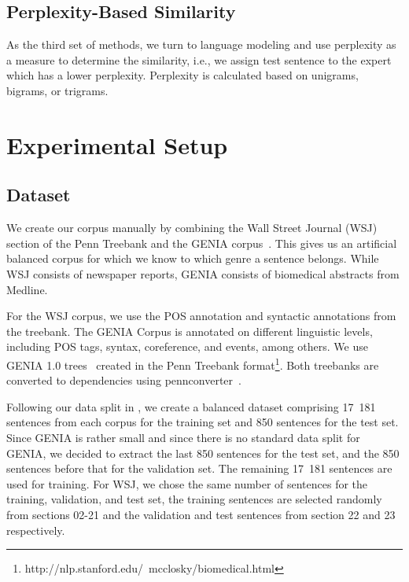 \subsection{Perplexity-Based Similarity}

As the third set of methods, we turn to language modeling and use perplexity as a measure to determine the similarity, i.e., we assign test sentence to the expert which has a lower perplexity. Perplexity is calculated based on unigrams, bigrams, or trigrams.


\section{Experimental Setup} \label{exptsetup}

\subsection{Dataset}

We create our corpus manually by combining the Wall Street Journal (WSJ)~\cite{marcus:kim:ea:94} section of the Penn Treebank and the GENIA corpus~\cite{tateisi:tsujii:04}. This gives us an artificial balanced corpus for which we know to which genre a sentence belongs.  While WSJ consists of newspaper reports, GENIA consists of biomedical abstracts from Medline.


For the WSJ corpus, we use the POS annotation and syntactic annotations  from the treebank. The GENIA Corpus is annotated on different linguistic levels, including POS tags, syntax, coreference, and events, among others. We use GENIA 1.0 trees~\cite{Ohta:2002:GCA:1289189.1289260} created in the Penn Treebank format\footnote{http://nlp.stanford.edu/~mcclosky/biomedical.html}. Both treebanks are converted to dependencies using pennconverter~\cite{johansson2007a}.

Following our data split in , we create a balanced dataset comprising 17~181 sentences from each corpus for the training set and 850 sentences for the test set. Since GENIA is rather small and since there is no standard data split for GENIA, we decided to extract the last 850 sentences for the test set, and the 850 sentences before that for the validation set. The remaining 17~181 sentences are used for training. For WSJ, we chose the same number of sentences for the training, validation,  and test set, the training sentences are selected randomly from sections 02-21 and the validation and test sentences from section 22 and 23 respectively.


